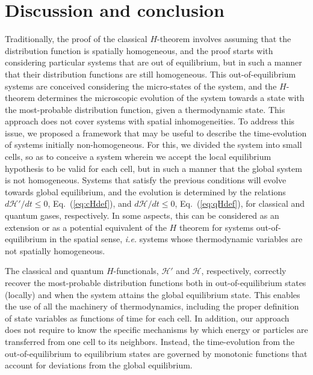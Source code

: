 
\section{Discussion and conclusion}\label{sec:disscussion}

Traditionally, the proof of the classical $H$-theorem involves assuming that the
distribution function is spatially homogeneous, and the proof starts with
considering particular systems that are out of equilibrium, but in such a manner
that their distribution functions are still homogeneous. This out-of-equilibrium systems
are conceived considering the micro-states of the system, and the $H$-theorem determines
the microscopic evolution of the system towards a state with the most-probable distribution function,
given a thermodynamic state. 
This approach does not cover systems with spatial inhomogeneities.
To address this issue, we
proposed a framework that may be useful to describe the time-evolution of systems
initially non-homogeneous. For this, we divided the
system into small cells, so as to conceive a system wherein we accept the local equilibrium
hypothesis to be valid for each cell, but in such a manner that the global system is not homogeneous. Systems
that satisfy the previous conditions will evolve towards global equilibrium, and the evolution is
determined by the relations $d\mathcal{H}'/dt\leq0$, Eq.~(\ref{eq:cHdef}),
and $d\mathcal{H}/dt\leq0$, Eq.~(\ref{eq:qHdef}), for classical and quantum gases, respectively.
In some aspects, this can be considered as an extension or as a potential equivalent of the $H$ theorem
for systems out-of-equilibrium in the spatial sense, \textit{i.e.} systems whose thermodynamic
variables are not spatially homogeneous.

The classical and quantum $H$-functionals, $\mathcal{H}'$ and $\mathcal{H}$, respectively,
correctly recover the most-probable distribution
functions both in out-of-equilibrium states (locally) and when the system attains the global
equilibrium state. This enables the use of all the machinery of thermodynamics, including the
proper definition of state variables as functions of time for each cell. In addition, our approach
does not require to know the specific mechanisms by which energy or particles are transferred from one
cell to its neighbors. Instead, the time-evolution from the out-of-equilibrium to equilibrium states are
governed by monotonic functions that account for deviations from the global equilibrium.

